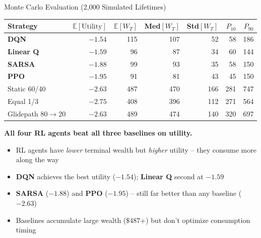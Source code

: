 \documentclass[aspectratio=169, 11pt]{beamer}
\begin{document}
\begin{frame}{Monte Carlo Evaluation (2,000 Simulated Lifetimes)}

\begin{center}
\small
\begin{tabular}{l r r r r r r}
\toprule
\textbf{Strategy} & $\mathbb{E}[\text{Utility}]$ & $\mathbb{E}[W_T]$ & Med$[W_T]$ & Std$[W_T]$ & $P_{10}$ & $P_{90}$ \\
\midrule
\textbf{DQN}       & $\mathbf{-1.54}$ & 115   & 107   & 52    & 58    & 186 \\
\textbf{Linear Q}  & $-1.59$          & 96    & 87    & 34    & 60    & 144 \\
\textbf{SARSA}     & $-1.88$          & 99    & 93    & 35    & 58    & 150 \\
\textbf{PPO}       & $-1.95$          & 91    & 81    & 43    & 45    & 150 \\
\midrule
Static 60/40       & $-2.63$          & 487   & 470   & 166   & 281   & 747 \\
Equal 1/3          & $-2.75$          & 408   & 396   & 112   & 271   & 564 \\
Glidepath 80$\to$20 & $-2.63$         & 489   & 474   & 140   & 320   & 697 \\
\bottomrule
\end{tabular}
\end{center}

\vspace{0.5em}
\textbf{All four RL agents beat all three baselines on utility.}

\vspace{0.3em}
\begin{itemize}
    \item RL agents have \textit{lower} terminal wealth but \textit{higher} utility -- they consume more along the way
    \item \textbf{DQN} achieves the best utility ($-1.54$); \textbf{Linear Q} second at $-1.59$
    \item \textbf{SARSA} ($-1.88$) and \textbf{PPO} ($-1.95$) -- still far better than any baseline ($-2.63$)
    \item Baselines accumulate large wealth ($\$487$+) but don't optimize consumption timing
\end{itemize}
\end{frame}
\end{document}
